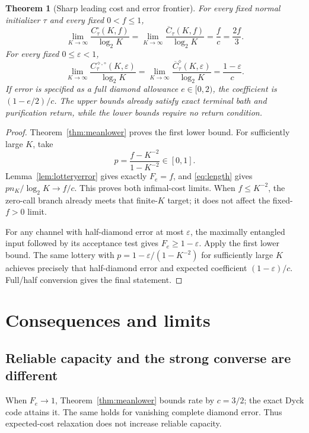 \documentclass[11pt]{article}
\newtheorem{theorem}{Theorem}[section]
\begin{document}
\begin{theorem}[Sharp leading cost and error frontier]\label{thm:frontier}
For every fixed normal initializer $\tau$ and every fixed $0<f\le1$,
\begin{equation}
 \lim_{K\to\infty}\frac{C_\tau^\circ(K,f)}{\log_2K}
 =\lim_{K\to\infty}\frac{\overline C_\tau(K,f)}{\log_2K}
 =\frac f c=\frac{2f}{3}.\label{eq:frontierfe}
\end{equation}
For every fixed $0\le\varepsilon<1$,
\begin{equation}
 \lim_{K\to\infty}\frac{C_\tau^{\diamond,\circ}(K,\varepsilon)}{\log_2K}
 =\lim_{K\to\infty}\frac{\overline C_\tau^\diamond(K,\varepsilon)}{\log_2K}
 =\frac{1-\varepsilon}{c}.\label{eq:frontierdiamond}
\end{equation}
If error is specified as a full diamond allowance $e\in[0,2)$, the coefficient is $(1-e/2)/c$. The upper bounds already satisfy exact terminal bath and purification return, while the lower bounds require no return condition.
\end{theorem}
\begin{proof}
Theorem~\ref{thm:meanlower} proves the first lower bound. For sufficiently large $K$, take
\[
 p=\frac{f-K^{-2}}{1-K^{-2}}\in[0,1].
\]
Lemma~\ref{lem:lotteryerror} gives exactly $F_e=f$, and \eqref{eq:length} gives $pn_K/\log_2K\to f/c$. This proves both infimal-cost limits. When $f\le K^{-2}$, the zero-call branch already meets that finite-$K$ target; it does not affect the fixed-$f>0$ limit.

For any channel with half-diamond error at most $\varepsilon$, the maximally entangled input followed by its acceptance test gives $F_e\ge1-\varepsilon$. Apply the first lower bound. The same lottery with
$p=1-\varepsilon/(1-K^{-2})$ for sufficiently large $K$ achieves precisely that half-diamond error and expected coefficient $(1-\varepsilon)/c$. Full/half conversion gives the final statement.
\end{proof}

\section{Consequences and limits}\label{sec:consequences}

\subsection{Reliable capacity and the strong converse are different}

When $F_e\to1$, Theorem~\ref{thm:meanlower} bounds rate by $c=3/2$; the exact Dyck code attains it. The same holds for vanishing complete diamond error. Thus expected-cost relaxation does not increase reliable capacity.
\end{document}
